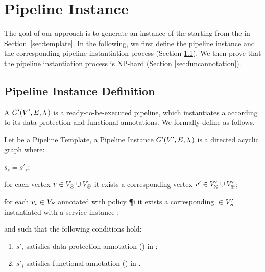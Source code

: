 \section{Pipeline Instance}\label{sec:instance}
The goal of our approach is to generate an instance of the \pipelineTemplate starting from the \pipelineTemplate in Section~\ref{sec:template}. In the following, we first define the pipeline instance and the corresponding pipeline instantiation process (Section \ref{sec:instancedefinition}). We then prove that the pipeline instantiation process is NP-hard (Section \ref{sec:funcannotation}).

\subsection{Pipeline Instance Definition}\label{sec:instancedefinition}
A \pipelineInstance $G'(V',E,\lambda\,)$ is a ready-to-be-executed pipeline, which instantiates a \pipelineTemplate \tChartFunction {} according to its data protection and functional annotations. We formally define \tChartFunction as follows.

    \begin{definition}\label{def:instance}
      Let \tChartFunction be a Pipeline Template, a Pipeline Instance $G'(V',E,\lambda\,)$ is a directed acyclic graph where:
      \begin{enumerate*}[label=\textit{\roman*})]
        \item $s_r$$=$$s'_r$;
        \item for each vertex $v_{}\in V_{\otimes}\cup V_{\oplus}$ it exists a corresponding vertex $v'_{}\in V'_{\otimes}\cup V'_{\oplus}$;
        \item for each $v_{i}$$\in$$V_S$ annotated with policy \P{i} it exists a corresponding $\in$$V'_S$ instantiated with a service instance ;
      \end{enumerate*}
      and such that the following conditions hold:
      \begin{enumerate}[label=\arabic*)]
        \item $s'_i$ satisfies data protection annotation \myLambda() in \tChartFunction;
        \item $s'_i$ satisfies functional annotation \myGamma() in \tChartFunction.
      \end{enumerate}
    \end{definition}

